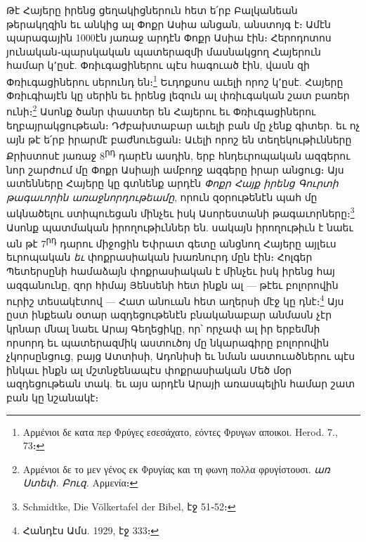 \documentclass{article}
\begin{document}
{Թէ Հայերը իրենց ցեղակիցներուն հետ ե՛րբ Բալկանեան թերակղզին եւ անկից ալ Փոքր Ասիա անցան, անստոյգ է։ Ամէն պարագային 1000էն յառաջ արդէն Փոքր Ասիա էին։ Հերոդոտոս յունական֊պարսկական պատերազմի մասնակցող Հայերուն համար կ՚ըսէ. Փռիւգացիներու պէս հագուած էին, վասն զի Փռիւգացիներու սերունդ են։\footnote{Αρμένιοι δε κατα περ Φρύγες εσεσάχατο, εόντες Φρυγων αποικοι. Herod. 7., 73։} Եւդոքսոս աւելի որոշ կ՚ըսէ. Հայերը Փռիւգիայէն կը սերին եւ իրենց լեզուն ալ փռիւգական շատ բառեր ունի։\footnote{Αρμένιοι δε το μεν γένος εκ Φρυγίας και τη φωνη πολλα φρυγίστουσι. \emph{առ Ստեփ. Բուզ.} Αρμενία։} Ասոնք ծանր փաստեր են Հայերու եւ Փռիւգացիներու եղբայրակցութեան։ Դժբախտաբար աւելի բան մը չենք գիտեր. եւ ոչ այն թէ ե՛րբ իրարմէ բաժնուեցան։ Աւելի որոշ են տեղեկութիւնները Քրիստոսէ յառաջ 8\textsuperscript{րդ} դարէն ասդին, երբ հնդեւրոպական ազգերու նոր շարժում մը Փոքր Ասիայի ամբողջ ազգերը իրար անցուց։ Այս ատենները Հայերը կը գտնենք արդէն \emph{Փոքր Հայք իրենց Գուրտի թագաւորին առաջնորդութեամը}, որուն զօրութենէն պահ մը ակնածելու ստիպուեցան մինչեւ իսկ Ասորեստանի թագաւորները։\footnote{Schmidtke, Die Völkertafel der Bibel, էջ 51֊52։} Ասոնք պատմական իրողութիւններ են. սակայն իրողութիւն է նաեւ ան թէ 7\textsuperscript{րդ} դարու միջոցին Եփրատ գետը անցնող Հայերը այլեւս եւրոպական \emph{եւ} փոքրասիական խառնուրդ մըն էին։ Հոլգեր Պետերսընի համաձայն փոքրասիական է մինչեւ իսկ իրենց հայ ազգանունը, զոր հիմայ Յենսենի հետ ինքն ալ — թէեւ բոլորովին ուրիշ տեսակէտով — Հատ անուան հետ աղերսի մէջ կը դնէ։\footnote{Հանդէս Ամս. 1929, էջ 333։} Այս ըստ ինքեան օտար ազդեցութենէն բնականաբար անմասն չէր կրնար մնալ նաեւ Արայ Գեղեցիկը, որ՝ որչափ ալ իր երբեմնի որսորդ եւ պատերազմիկ աստուծոյ մը նկարագիրը բոլորովին չկորսընցուց, բայց Ատտիսի, Ադոնիսի եւ նման աստուածներու պէս ինկաւ ինքն ալ մշտնջենապէս փոքրասիական Մեծ մօր ազդեցութեան տակ. եւ այս արդէն Արայի առասպելին համար շատ բան կը նշանակէ։}
\clearpage
\end{document}
